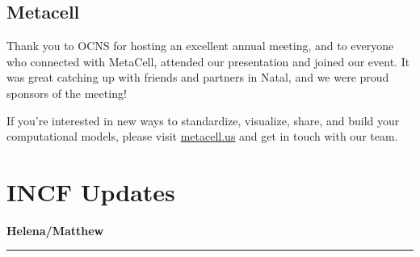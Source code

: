 \documentclass[11pt,a4paper,oneside]{article}
\begin{document}
\subsection*{Metacell}%
\begin{displayquote}
  Thank you to OCNS for hosting an excellent annual meeting, and to everyone who connected with MetaCell, attended our presentation and joined our event.
  It was great catching up with friends and partners in Natal, and we were proud sponsors of the meeting!

  If you're interested in new ways to standardize, visualize, share, and build your computational models, please visit \url{metacell.us} and get in touch with our team.
\end{displayquote}

\newpage
\section*{INCF Updates}%
\textbf{\large Helena/Matthew\\}
\rule{\textwidth}{0.4pt}
\lipsum[1-3]
\end{document}
